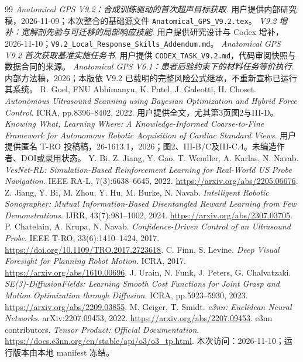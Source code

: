 \documentclass[UTF8,fontset=fandol,11pt,a4paper]{ctexart}
\theoremstyle{plain}
\theoremstyle{definition}
\theoremstyle{remark}
\numberwithin{equation}{section}
\newcommand{\code}[1]{\begingroup\small\nolinkurl{#1}\endgroup}
\begin{document}
\begin{thebibliography}{99}
 \emph{Anatomical GPS V9.2：合成训练驱动的首次超声目标获取}. 用户提供内部研究稿，2026-11-09；本次整合的基础源文件 \code{Anatomical_GPS_V9.2.tex}。
 \emph{V9.2 增补：宽解剖先验与可迁移的局部响应技能}. 用户提供研究设计与 Codex 增补，2026-11-10；\code{V9.2_Local_Response_Skills_Addendum.md}。
 \emph{Anatomical GPS V9.2 首次获取基准实施任务书}. 用户提供 \code{CODEX_TASK_V9.2.md}，代码审阅快照与数据合同的来源。
 \emph{Anatomical GPS V6.1：患者后验约束下的材料任务等价执行}. 内部方法稿，2026；本版依 V9.2 已载明的完整风险公式继承，不重新宣称已运行其系统。
 R. Goel, FNU Abhimanyu, K. Patel, J. Galeotti, H. Choset.
\emph{Autonomous Ultrasound Scanning using Bayesian Optimization and Hybrid Force Control}. ICRA, pp.8396--8402, 2022. 用户提供全文，尤其第3页图2与III-D。
 \emph{Knowing What, Learning Where: A Knowledge-Informed Coarse-to-Fine Framework for Autonomous Robotic Acquisition of Cardiac Standard Views}. 用户提供匿名 T-RO 投稿稿，26-1613.1，2026；图2、III-B/C及III-C.4。未编造作者、DOI或录用状态。
 Y. Bi, Z. Jiang, Y. Gao, T. Wendler, A. Karlas, N. Navab.
\emph{VesNet-RL: Simulation-Based Reinforcement Learning for Real-World US Probe Navigation}. IEEE RA-L, 7(3):6638--6645, 2022. \url{https://arxiv.org/abs/2205.06676}.
 Z. Jiang, Y. Bi, M. Zhou, Y. Hu, M. Burke, N. Navab.
\emph{Intelligent Robotic Sonographer: Mutual Information-Based Disentangled Reward Learning from Few Demonstrations}. IJRR, 43(7):981--1002, 2024. \url{https://arxiv.org/abs/2307.03705}.
 P. Chatelain, A. Krupa, N. Navab.
\emph{Confidence-Driven Control of an Ultrasound Probe}. IEEE T-RO, 33(6):1410--1424, 2017. \url{https://doi.org/10.1109/TRO.2017.2723618}.
 C. Finn, S. Levine.
\emph{Deep Visual Foresight for Planning Robot Motion}. ICRA, 2017. \url{https://arxiv.org/abs/1610.00696}.
 J. Urain, N. Funk, J. Peters, G. Chalvatzaki.
\emph{SE(3)-DiffusionFields: Learning Smooth Cost Functions for Joint Grasp and Motion Optimization through Diffusion}. ICRA, pp.5923--5930, 2023. \url{https://arxiv.org/abs/2209.03855}.
 M. Geiger, T. Smidt.
\emph{e3nn: Euclidean Neural Networks}. arXiv:2207.09453, 2022. \url{https://arxiv.org/abs/2207.09453}.
 e3nn contributors. \emph{Tensor Product: Official Documentation}. \url{https://docs.e3nn.org/en/stable/api/o3/o3_tp.html}. 本次访问：2026-11-10；运行版本由本地 manifest 冻结。

\end{thebibliography}
\end{document}
